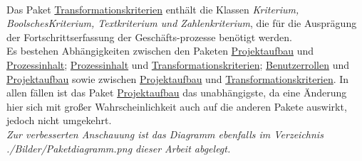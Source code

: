 \vspace{1em}
\\Das Paket \underline{Transformationskriterien} enthält die Klassen \emph{Kriterium, BoolschesKriterium, Textkriterium und Zahlenkriterium}, die für die Ausprägung der Fortschrittserfassung der Geschäfts-prozesse benötigt werden.
\vspace{1em}
\\Es bestehen Abhängigkeiten zwischen den Paketen \underline{Projektaufbau} und \underline{Prozessinhalt}; \underline{Prozessinhalt} und \underline{Transformationskriterien}; \underline{Benutzerrollen} und \underline{Projektaufbau} sowie zwischen \underline{Projektaufbau} und \underline{Transformationskriterien}. In allen fällen ist das Paket \underline{Projektaufbau} das unabhängigste, da eine Änderung hier sich mit großer Wahrscheinlichkeit auch auf die anderen Pakete auswirkt, jedoch nicht umgekehrt.
\vspace{1em}
\\\emph{Zur verbesserten Anschauung ist das Diagramm ebenfalls im Verzeichnis ./Bilder/Paketdiagramm.png dieser Arbeit abgelegt.}












